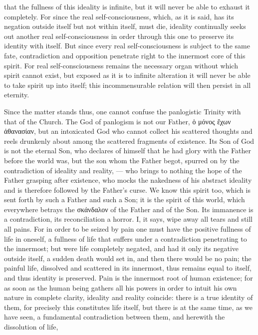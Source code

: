 \documentclass[12pt]{book}
\newcommand{\opage}[1]{\marginnote{\footnotesize\textit{[#1]}}}
\begin{document}
that the fullness of this ideality is infinite, but it will never be able to
exhaust it completely. For since the real self-consciousness, which, as it is
said, has its negation outside itself but not within itself, must die, ideality
continually seeks out another real self-consciousness in order through this one
to preserve its identity with itself. But since every real self-consciousness is
subject to the same fate, contradiction and opposition penetrate right to the
innermost core of this spirit. For real self-consciousness remains the necessary
organ without which spirit cannot exist, but exposed as it is to infinite
alteration it will never be able to take spirit up into itself; this
incommensurable relation will then persist in all eternity.

Since the matter stands thus, one cannot confuse the panlogistic Trinity with
that of the Church. The God of panlogism is not our Father,
ὁ μόνος ἔχων ἀθανασίαν, but an intoxicated God who cannot collect his scattered
thoughts and reels drunkenly about among the scattered fragments of existence.
Its Son of God is not the eternal Son, who declares of himself that he had glory
with the Father before the world was, but the son whom the Father begot, spurred
on by the contradiction of ideality
\opage{142} and reality, --- who brings to nothing the hope of the Father
grasping after existence, who mocks the nakedness of his abstract ideality and
is therefore followed by the Father's curse. We know this spirit too, which is
sent forth by such a Father and such a Son; it is the spirit of this world,
which everywhere betrays the σκάνδαλον of the Father and of the Son. Its
immanence is a contradiction, its reconciliation a horror. I, it says, wipe away
all tears and still all pains. For in order to be seized by pain one must have
the positive fullness of life in oneself, a fullness of life that suffers under
a contradiction penetrating to the innermost; but were life completely negated,
and had it only its negative outside itself, a sudden death would set in, and
then there would be no pain; the painful life, dissolved and scattered in its
innermost, thus remains equal to itself, and thus identity is preserved. Pain is
the innermost root of human existence; for as soon as the human being gathers
all his powers in order to intuit his own nature in complete clarity, ideality
and reality coincide: there is a true identity of them, for precisely this
constitutes life itself, but there is at the same time, as we have seen, a
fundamental contradiction between them, and herewith the dissolution of life,
\end{document}
